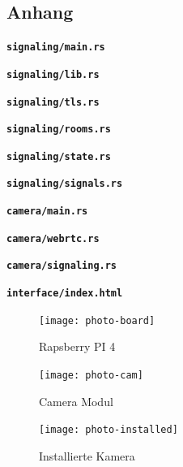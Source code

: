 \documentclass{article}
\begin{document}
\begin{onecolumn}
\begin{appendix}

\section*{Anhang}

\begin{scriptsize}
	\begin{flushleft}
		\texttt{\textbf{signaling/main.rs}}
		
		\texttt{\textbf{signaling/lib.rs}}
		
		\texttt{\textbf{signaling/tls.rs}}
		
		\texttt{\textbf{signaling/rooms.rs}}
		
		\texttt{\textbf{signaling/state.rs}}
		
		\texttt{\textbf{signaling/signals.rs}}
		
		\texttt{\textbf{camera/main.rs}}
		
		\texttt{\textbf{camera/webrtc.rs}}
		
		\texttt{\textbf{camera/signaling.rs}}
		

		\texttt{\textbf{interface/index.html}}
		
	\end{flushleft}
\end{scriptsize}

\begin{figure}[p]
	\texttt{[image: photo-board]}
	\centering
	\caption{Rapsberry PI 4}
\end{figure}

\begin{figure}[p]
	\texttt{[image: photo-cam]}
	\centering
	\caption{Camera Modul}
\end{figure}

\begin{figure}[p]
	\texttt{[image: photo-installed]}
	\centering
	\caption{Installierte Kamera}
\end{figure}

\end{appendix}
\end{onecolumn}

\end{document}
